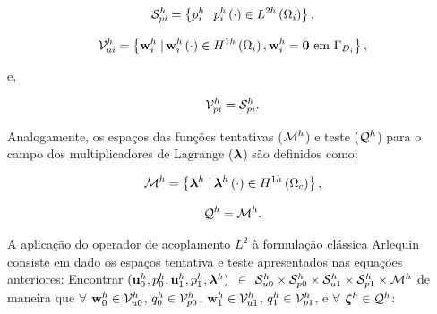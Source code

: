 \documentclass[tese_patricia]{subfiles}
\begin{document}
\begin{align}
	\mathcal{S}_{pi}^h = \left\{p_{i}^{h} \left . \right| p_{i}^{h} \left(\cdot\right) \in L^{2h}\left(\Omega_{i}\right) \right\},
\end{align}

\begin{align}
	\mathcal{V}_{ui}^h = \left\{\mathbf{w}_{i}^{h} \left . \right| \mathbf{w}_{i}^{h} \left(\cdot\right) \in H^{1h}\left(\Omega_i\right), \mathbf{w}_{i}^{h} = \mathbf{0} \textrm { em} \ \Gamma_{D_i} \right\},
\end{align}

e,

\begin{align}
	\mathcal{V}_{pi}^h = \mathcal{S}_{pi}^h.
\end{align}

Analogamente, os espaços das funções tentativas ($\mathcal{M}^h$) e teste ($\mathcal{Q}^h$) para o campo dos multiplicadores de Lagrange ($\boldsymbol{\lambda}$) são definidos como:

\begin{align}
	\mathcal{M}^h = \left\{\boldsymbol{\lambda}^{h} \left . \right| \boldsymbol{\lambda}^{h} \left(\cdot\right) \in H^{1h}\left(\Omega_{c}\right) \right\},
\end{align}

\begin{align}
	\mathcal{Q}^h = \mathcal{M}^h.
\end{align}

A aplicação do operador de acoplamento $L^{2}$ à formulação clássica Arlequin consiste em dado os espaços tentativa e teste apresentados nas equações anteriores: Encontrar $(\mathbf{u}_0^h,p_0^h,\mathbf{u}_1^h,p_1^h,\boldsymbol{\lambda}^h)$ $\in$ $\mathcal{S}_{u0}^h \times \mathcal{S}_{p0}^h \times \mathcal{S}_{u1}^h \times \mathcal{S}_{p1}^h \times \mathcal{M}^h$ de maneira que  $\forall$ $\mathbf{w}_0^h \in \mathcal{V}_{u0}^h$, $q_0^h \in \mathcal{V}_{p0}^h$, $\mathbf{w}_1^h \in \mathcal{V}_{u1}^h$, $q_1^h \in \mathcal{V}_{p1}^h$, e $\forall$ $\boldsymbol{\zeta}^h \in \mathcal{Q}^h$:
\end{document}
